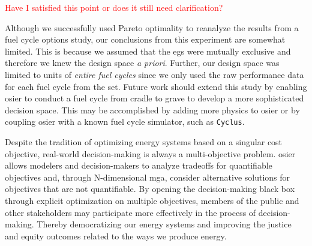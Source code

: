 \textcolor{red}{Have I satisfied this point or does it still need clarification?}

Although we successfully used Pareto optimality to reanalyze the results from 
a fuel cycle options study, our conclusions from this experiment are somewhat 
limited. This is because we assumed that the \glspl{eg} were mutually exclusive
and therefore we knew the design space \textit{a priori}. Further, our design space
was limited to units of \textit{entire fuel cycles} since we only used the raw 
performance data for each fuel cycle from the \gls{set}. Future work should 
extend this study by enabling \gls{osier} to conduct a fuel cycle from cradle to 
grave to develop a more sophisticated decision space. This may be accomplished
by adding more physics to \gls{osier} or by coupling \gls{osier} with a known 
fuel cycle simulator, such as \texttt{Cyclus}\cite{huff_fundamental_2016}.

Despite the tradition of optimizing energy systems based on a singular cost
objective, real-world decision-making is always a multi-objective problem.
\gls{osier} allows modelers and decision-makers to analyze tradeoffs for 
quantifiable objectives and, through N-dimensional \gls{mga}, consider
alternative solutions for objectives that are not quantifiable. By opening
the decision-making black box through explicit optimization on multiple objectives,
members of the public and other stakeholders may participate more effectively 
in the process of decision-making. Thereby democratizing our energy systems and improving
the justice and equity outcomes related to the ways we produce energy.
